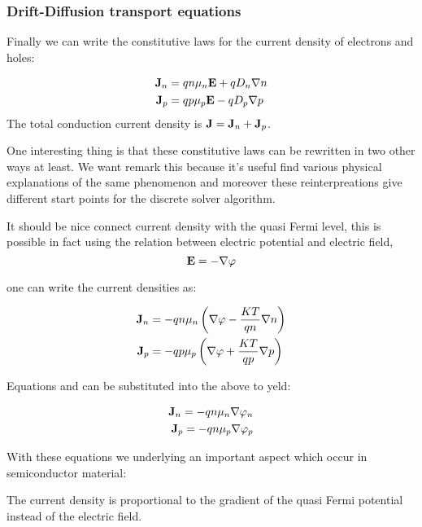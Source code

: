 \subsubsection{Drift-Diffusion transport equations}
\label{subsub:driftdiffusion transport}

Finally we can write the constitutive laws for the current density of electrons and holes:

\begin{align}
\mathbf{J}_n &= qn\mu_n\mathbf{E} + qD_n\nabla n  \label{eq: drift diff electron}\\ 
\mathbf{J}_p &= qp\mu_p\mathbf{E} - qD_p \nabla p \label{eq: drift diff hole}
\end{align}
The total conduction current density is $\mathbf{J}=\mathbf{J}_n+\mathbf{J}_p$.

One interesting thing is that these constitutive laws can be rewritten in two other ways at least. We want remark this because it's useful find various physical explanations of the same phenomenon and moreover these reinterpreations  give different start points for the discrete solver algorithm.

It should be nice connect current density with the quasi Fermi level, this is possible in fact using the relation between electric potential and electric field,
\begin{equation}
\mathbf{E}  = -\nabla \varphi
\end{equation}

one can write the current densities as:

\begin{align*}
\mathbf{J}_n &= -qn\mu_n\left(\nabla \varphi - \dfrac{KT}{qn}\nabla n \right)\\ 
\mathbf{J}_p &= -qp\mu_p\left(\nabla \varphi+ \dfrac{KT}{qp} \nabla p \right)
\end{align*}

Equations  and  can be substituted into the above to yeld:

\begin{align}
\mathbf{J}_n = -qn\mu_n\nabla \varphi_n \\
\mathbf{J}_p = -qn\mu_p\nabla \varphi_p 
\end{align}

With these equations we underlying an important aspect which occur in semiconductor material:
\begin{Osservazione}
The current density is proportional to the gradient of the quasi Fermi potential instead of the electric field.
\end{Osservazione}

